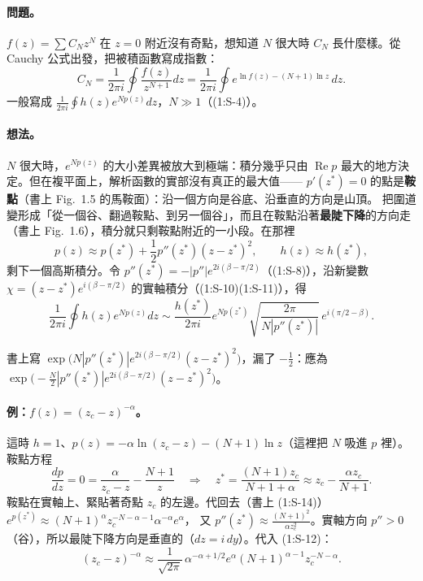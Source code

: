 \paragraph{問題。}
$f(z)=\sum C_Nz^N$ 在 $z=0$ 附近沒有奇點，想知道 $N$ 很大時 $C_N$ 長什麼樣。從 Cauchy 公式出發，把被積函數寫成指數：
\begin{equation}
C_N=\frac1{2\pi i}\oint\frac{f(z)}{z^{N+1}}dz=\frac1{2\pi i}\oint e^{\ln f(z)-(N+1)\ln z}\,dz. \tag{1:S-2, 1:S-3}
\end{equation}
一般寫成 $\frac1{2\pi i}\oint h(z)e^{Np(z)}dz$，$N\gg1$（(1:S-4)）。

\paragraph{想法。}
$N$ 很大時，$e^{Np(z)}$ 的大小差異被放大到極端：積分幾乎只由 $\operatorname{Re}p$ 最大的地方決定。但在複平面上，解析函數的實部沒有真正的最大值——
$p'(z^*)=0$ 的點是\textbf{鞍點}（書上 Fig.~1.5 的馬鞍面）：沿一個方向是谷底、沿垂直的方向是山頂。
把圍道變形成「從一個谷、翻過鞍點、到另一個谷」，而且在鞍點沿著\textbf{最陡下降}的方向走（書上 Fig.~1.6），積分就只剩鞍點附近的一小段。在那裡
\begin{equation}
p(z)\approx p(z^*)+\frac12p''(z^*)(z-z^*)^2,\qquad h(z)\approx h(z^*), \tag{1:S-5, 1:S-6}
\end{equation}
剩下一個高斯積分。令 $p''(z^*)=-|p''|e^{2i(\beta-\pi/2)}$（(1:S-8)），沿新變數 $\chi=(z-z^*)e^{i(\beta-\pi/2)}$ 的實軸積分（(1:S-10)(1:S-11)），得
\begin{equation}
\frac1{2\pi i}\oint h(z)e^{Np(z)}dz\sim\frac{h(z^*)}{2\pi i}e^{Np(z^*)}\sqrt{\frac{2\pi}{N|p''(z^*)|}}\,e^{i(\pi/2-\beta)}. \tag{1:S-12}
\end{equation}

\begin{errbox}[p.~21，(1:S-9)]
書上寫 $\exp\big(N|p''(z^*)|e^{2i(\beta-\pi/2)}(z-z^*)^2\big)$，漏了 $-\frac12$：應為 $\exp\big(-\frac N2|p''(z^*)|e^{2i(\beta-\pi/2)}(z-z^*)^2\big)$。
\end{errbox}

\paragraph{例：$f(z)=(z_c-z)^{-\alpha}$。}
這時 $h=1$、$p(z)=-\alpha\ln(z_c-z)-(N+1)\ln z$（這裡把 $N$ 吸進 $p$ 裡）。鞍點方程
\begin{equation}
\frac{dp}{dz}=0=\frac{\alpha}{z_c-z}-\frac{N+1}{z}\quad\Longrightarrow\quad z^*=\frac{(N+1)z_c}{N+1+\alpha}\approx z_c-\frac{\alpha z_c}{N+1}. \tag{1:S-13}
\end{equation}
鞍點在實軸上、緊貼著奇點 $z_c$ 的左邊。代回去（書上 (1:S-14)）$e^{p(z^*)}\approx(N+1)^\alpha z_c^{-N-\alpha-1}\alpha^{-\alpha}e^\alpha$，
又 $p''(z^*)\approx\frac{(N+1)^2}{\alpha z_c^2}$。實軸方向 $p''>0$（谷），所以最陡下降方向是垂直的（$dz=i\,dy$）。代入 (1:S-12)：
\begin{equation}
[z^N](z_c-z)^{-\alpha}\approx\frac{1}{\sqrt{2\pi}}\,\alpha^{-\alpha+1/2}e^\alpha(N+1)^{\alpha-1}z_c^{-N-\alpha}. \tag{1:S-15}
\end{equation}

